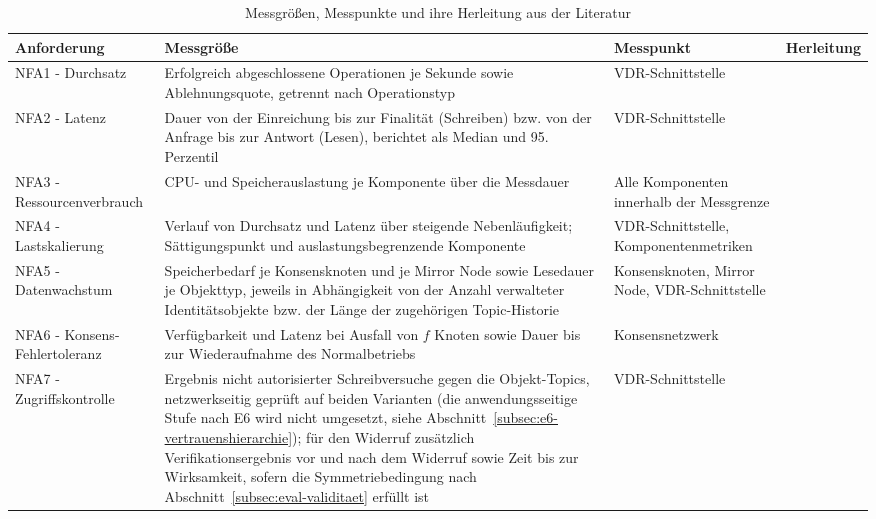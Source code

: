 \begin{table}[htbp]
\renewcommand{\arraystretch}{1.3}
\footnotesize
  \centering
  \caption{Messgrößen, Messpunkte und ihre Herleitung aus der Literatur}
  \label{tab:messgroessen}
  \begin{tabular}{p{} p{} p{} p{}}
    \toprule
    \textbf{Anforderung} & \textbf{Messgröße} & \textbf{Messpunkt} & \textbf{Herleitung} \\
    \midrule
    NFA1 - Durchsatz & Erfolgreich abgeschlossene Operationen je Sekunde sowie Ablehnungsquote, getrennt nach Operationstyp & VDR-Schnittstelle & \cite{sehimibendaoud2023, tawfik2025, joshimahajan2025, hashim2021} \\
    NFA2 - Latenz & Dauer von der Einreichung bis zur Finalität (Schreiben) bzw. von der Anfrage bis zur Antwort (Lesen), berichtet als Median und 95. Perzentil & VDR-Schnittstelle & \cite{manoj2022, torongo2023, mamoru2026, satybaldy2026} \\
    NFA3 - Ressourcenverbrauch & CPU- und Speicherauslastung je Komponente über die Messdauer & Alle Komponenten innerhalb der Messgrenze & \cite{minango2025, amanat2022} \\
    NFA4 - Lastskalierung & Verlauf von Durchsatz und Latenz über steigende Nebenläufigkeit; Sättigungspunkt und auslastungsbegrenzende Komponente & VDR-Schnittstelle, Komponentenmetriken & \cite{mazlan2020, sehimibendaoud2023, joshimahajan2025, hashim2021} \\
    NFA5 - Datenwachstum & Speicherbedarf je Konsensknoten und je Mirror Node sowie Lesedauer je Objekttyp, jeweils in Abhängigkeit von der Anzahl verwalteter Identitätsobjekte bzw. der Länge der zugehörigen Topic-Historie & Konsensknoten, Mirror Node, VDR-Schnittstelle & \cite{mazlan2020, giao2026, mamoru2026, farin2025} \\
    NFA6 - Konsens-Fehlertoleranz & Verfügbarkeit und Latenz bei Ausfall von $f$ Knoten sowie Dauer bis zur Wiederaufnahme des Normalbetriebs & Konsensnetzwerk & \cite{hashim2021, verma2024, farin2025} \\
    NFA7 - Zugriffskontrolle & Ergebnis nicht autorisierter Schreibversuche gegen die Objekt-Topics, netzwerkseitig geprüft auf beiden Varianten (die anwendungsseitige Stufe nach E6 wird nicht umgesetzt, siehe Abschnitt~\ref{subsec:e6-vertrauenshierarchie}); für den Widerruf zusätzlich Verifikationsergebnis vor und nach dem Widerruf sowie Zeit bis zur Wirksamkeit, sofern die Symmetriebedingung nach Abschnitt~\ref{subsec:eval-validitaet} erfüllt ist & VDR-Schnittstelle & \cite{mamoru2026, torongo2023, tawfik2025} \\
    \bottomrule
  \end{tabular}
\end{table}
\normalsize